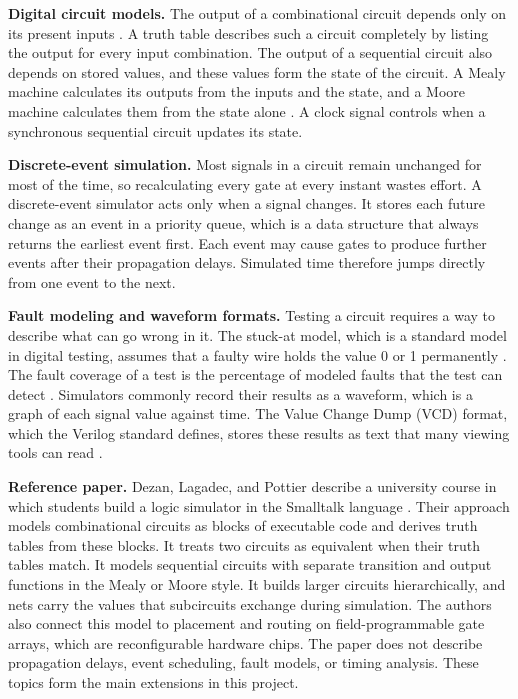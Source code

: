 \textbf{Digital circuit models.}
The output of a combinational circuit depends only on its present inputs .
A truth table describes such a circuit completely by listing the output for every input combination.
The output of a sequential circuit also depends on stored values, and these values form the state of the circuit.
A Mealy machine calculates its outputs from the inputs and the state, and a Moore machine calculates them from the state alone .
A clock signal controls when a synchronous sequential circuit updates its state.

\textbf{Discrete-event simulation.}
Most signals in a circuit remain unchanged for most of the time, so recalculating every gate at every instant wastes effort.
A discrete-event simulator acts only when a signal changes.
It stores each future change as an event in a priority queue, which is a data structure that always returns the earliest event first.
Each event may cause gates to produce further events after their propagation delays.
Simulated time therefore jumps directly from one event to the next.

\textbf{Fault modeling and waveform formats.}
Testing a circuit requires a way to describe what can go wrong in it.
The stuck-at model, which is a standard model in digital testing, assumes that a faulty wire holds the value 0 or 1 permanently .
The fault coverage of a test is the percentage of modeled faults that the test can detect .
Simulators commonly record their results as a waveform, which is a graph of each signal value against time.
The Value Change Dump (VCD) format, which the Verilog standard defines, stores these results as text that many viewing tools can read .

\textbf{Reference paper.}
Dezan, Lagadec, and Pottier describe a university course in which students build a logic simulator in the Smalltalk language .
Their approach models combinational circuits as blocks of executable code and derives truth tables from these blocks.
It treats two circuits as equivalent when their truth tables match.
It models sequential circuits with separate transition and output functions in the Mealy or Moore style.
It builds larger circuits hierarchically, and nets carry the values that subcircuits exchange during simulation.
The authors also connect this model to placement and routing on field-programmable gate arrays, which are reconfigurable hardware chips.
The paper does not describe propagation delays, event scheduling, fault models, or timing analysis.
These topics form the main extensions in this project.

